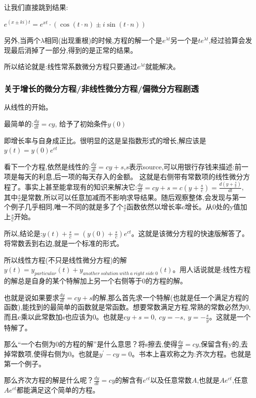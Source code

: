 \documentclass[UTF8]{ctexbook}
\newcommand{\derivative}{^\prime}
\begin{document}
{{{{让我们直接跳到结果:

$e^{(x \pm ki)t} = e^{xt}\cdot(\cos(t\cdot n) \pm i\sin(t\cdot n))$

另外,当两个$\lambda$相同(出现重根)的时候,方程的解一个是$e^{\lambda t}$另一个是$te^{\lambda t}$,经过验算会发现最后消掉了一部分,得到的是正常的结果。

所以结论就是:线性常系数微分方程只要通过$e^{\lambda t}$就能解决。
}%

\subsubsection{关于增长的微分方程/非线性微分方程/偏微分方程剧透}{
  从线性的开始。

  最简单的:$\frac{dy}{dt} = cy$, 给予了初始条件$y(0)$

  即增长率与自身成正比。很明显的这是呈指数形式的增长,解应该是$y(t) = y(0)e^{ct}$

  看下一个方程,依然是线性的:$\frac{dy}{dt} = cy + s$,$s$表示source,可以用银行存钱来描述:前一项是每天的利息,后一项的每天存入的金额。
  这就是右侧带有常数项的线性微分方程了。事实上甚至能拿现有的知识来解决它:$\frac{dy}{dt} = cy + s = c(y + \frac{s}{c}) = \frac{d(y + \frac{s}{c})}{dt}$, 其中$\frac{s}{c}$是常数,所以可以任意加减而不影响求导结果。随后观察整体,会发现与第一个例子几乎相同,唯一不同的就是多了个$\frac{s}{c}$函数依然以增长率c增长。从0处的y值加上$\frac{s}{c}$开始。

  所以,结论是:$y(t) + \frac{s}{c} = (y(0) + \frac{s}{c})e^{ct}$。这就是该微分方程的快速版解答了。将常数丢到右边,就是一个标准的形式。

  所以线性方程(不只是线性微分方程)的解$y(t) = y_{particular}(t) + y_{another\ solution\ with\ a\ right\ side\ 0}(t)$。用人话说就是:线性方程的解总是自身的某个特解加上另一个右侧等于0的方程的解。

  也就是说如果要求$\frac{dy}{dt} = cy + s$的解,那么首先求一个特解(也就是任一个满足方程的函数),能找到的最简单的函数就是常函数。想要常数满足方程,常熟的常数必然为0,而且c乘以此常数加s也应该为0。也就是$cy + s = 0,\ cy = -s, \ y = -\frac{s}{y}$。这就是一个特解了。

  那么“一个右侧为0的方程的解”是什么意思？将s擦去,使得$\frac{dy}{dt} = cy$,保留含有y的,去掉常数项,使得右侧为0。也就是$y\derivative - cy = 0$。书本上喜欢称之为:齐次方程。也就是第一个例子。

  那么齐次方程的解是什么呢？$\frac{dy}{dt} = cy$的解含有$e^{ct}$以及任意常数$A$,也就是$Ae^{ct}$,任意$Ae^{ct}$都能满足这个简单的方程。

}}}}
\end{document}
